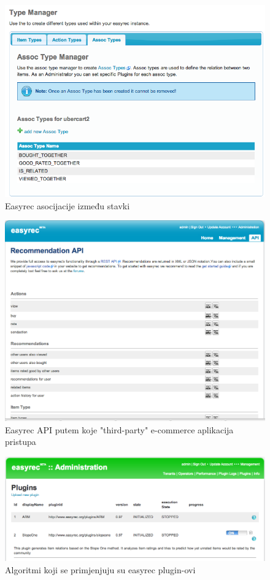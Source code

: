 \documentclass[times, utf8, seminar]{fit}
\begin{document}
{{{\begin{figure}[H]
\centering
\includegraphics[width=12cm]{img/easyrec_8_item_assoc.png}
\caption{Easyrec asocijacije između stavki}
\end{figure}

\begin{figure}[H]
\centering
\includegraphics[width=12cm]{img/easyrec_9_recommend_api.png}
\caption{Easyrec API putem koje "third-party" e-commerce aplikacija pristupa}
\end{figure}

\begin{figure}[H]
\centering
\includegraphics[width=12cm]{img/easyrec_10_plugins.png}
\caption{Algoritmi koji se primjenjuju su easyrec plugin-ovi}
\end{figure}


}}}
\end{document}
